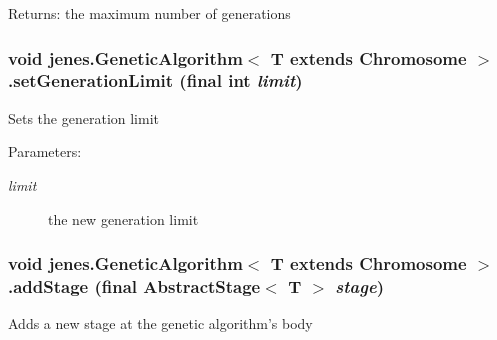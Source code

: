 \begin{Desc}
\item[Returns:]the maximum number of generations \end{Desc}
\hypertarget{classjenes_1_1_genetic_algorithm_3_01_t_01extends_01_chromosome_01_4_1e4d04de7cf34838296ad6745ac046f5}{
\subsubsection[setGenerationLimit]{\setlength{\rightskip}{0pt plus 5cm}void jenes.GeneticAlgorithm$<$ T extends Chromosome $>$.setGenerationLimit (final int {\em limit})}}
\label{classjenes_1_1_genetic_algorithm_3_01_t_01extends_01_chromosome_01_4_1e4d04de7cf34838296ad6745ac046f5}


Sets the generation limit 

\begin{Desc}
\item[Parameters:]
\begin{description}
\item[{\em limit}]the new generation limit \end{description}
\end{Desc}
\hypertarget{classjenes_1_1_genetic_algorithm_3_01_t_01extends_01_chromosome_01_4_a0ab85fdb0cb1880a469044affbb32e7}{
\subsubsection[addStage]{\setlength{\rightskip}{0pt plus 5cm}void jenes.GeneticAlgorithm$<$ T extends Chromosome $>$.addStage (final AbstractStage$<$ T $>$ {\em stage})}}
\label{classjenes_1_1_genetic_algorithm_3_01_t_01extends_01_chromosome_01_4_a0ab85fdb0cb1880a469044affbb32e7}


Adds a new stage at the genetic algorithm's body 


